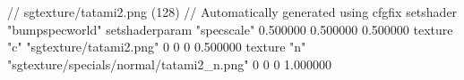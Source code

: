 // sgtexture/tatami2.png (128)
// Automatically generated using cfgfix
setshader "bumpspecworld"
setshaderparam "specscale" 0.500000 0.500000 0.500000
texture "c" "sgtexture/tatami2.png" 0 0 0 0.500000
texture "n" "sgtexture/specials/normal/tatami2_n.png" 0 0 0 1.000000
